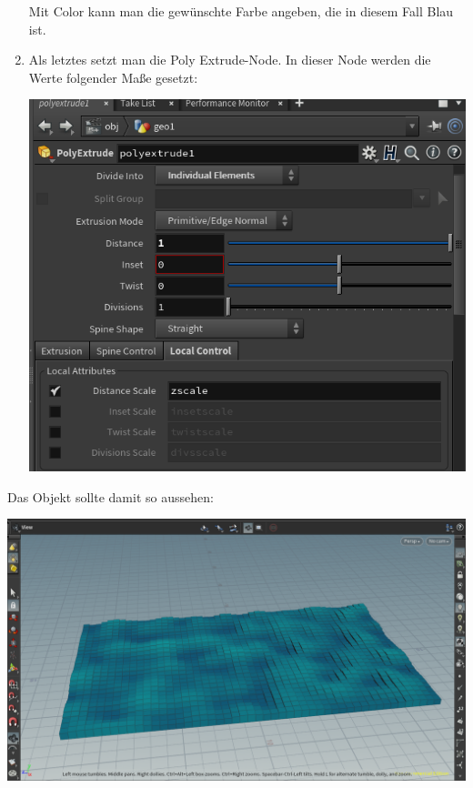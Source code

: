 \documentclass[paper=a4,fontsize=12pt,ngerman]{scrartcl}
\begin{document}
\begin{enumerate}
\begin{minipage}{0.5\textwidth}
		\end{minipage}
		\begin{minipage}{0.5\textwidth}
			Mit Color kann man die gewünschte Farbe angeben, die in diesem Fall Blau ist.\\
		\end{minipage}
		\item 
		\begin{minipage}{0.5\textwidth}
			Als letztes setzt man die Poly Extrude-Node. In dieser Node werden die Werte folgender Maße gesetzt:
		\end{minipage}
		\begin{minipage}{0.5\textwidth}
			\includegraphics[width=\textwidth]{graphics/wasser_4.png}
		\end{minipage}
	\end{enumerate}
	\begin{minipage}{0.5\textwidth}
			Das Objekt sollte damit so aussehen:
	\end{minipage}
	\begin{minipage}{0.5\textwidth}
		\includegraphics[width=\textwidth]{graphics/wasser_5.png}
	\end{minipage}
	
\end{document}
